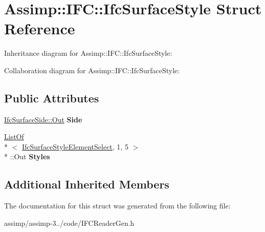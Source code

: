 \hypertarget{struct_assimp_1_1_i_f_c_1_1_ifc_surface_style}{\section{Assimp\+:\+:I\+F\+C\+:\+:Ifc\+Surface\+Style Struct Reference}
\label{struct_assimp_1_1_i_f_c_1_1_ifc_surface_style}
}


Inheritance diagram for Assimp\+:\+:I\+F\+C\+:\+:Ifc\+Surface\+Style\+:


Collaboration diagram for Assimp\+:\+:I\+F\+C\+:\+:Ifc\+Surface\+Style\+:
\subsection*{Public Attributes}
\begin{DoxyCompactItemize}
\item 
\hypertarget{struct_assimp_1_1_i_f_c_1_1_ifc_surface_style_a017064aa616816419ac98400dfcbdb4b}{\hyperlink{classboost_1_1shared__ptr}{Ifc\+Surface\+Side\+::\+Out} {\bfseries Side}}\label{struct_assimp_1_1_i_f_c_1_1_ifc_surface_style_a017064aa616816419ac98400dfcbdb4b}

\item 
\hypertarget{struct_assimp_1_1_i_f_c_1_1_ifc_surface_style_a8ab9d0eb18c1247c585dfa9b037d1cd3}{\hyperlink{struct_assimp_1_1_s_t_e_p_1_1_list_of}{List\+Of}\\*
$<$ \hyperlink{class_assimp_1_1_s_t_e_p_1_1_e_x_p_r_e_s_s_1_1_data_type}{Ifc\+Surface\+Style\+Element\+Select}, 1, 5 $>$\\*
\+::Out {\bfseries Styles}}\label{struct_assimp_1_1_i_f_c_1_1_ifc_surface_style_a8ab9d0eb18c1247c585dfa9b037d1cd3}

\end{DoxyCompactItemize}
\subsection*{Additional Inherited Members}


The documentation for this struct was generated from the following file\+:\begin{DoxyCompactItemize}
\item 
assimp/assimp-\/3../code/I\+F\+C\+Reader\+Gen.\+h\end{DoxyCompactItemize}

